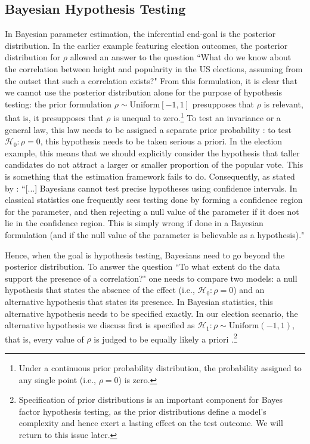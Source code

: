 \subsection{Bayesian Hypothesis Testing}
In Bayesian parameter estimation, the inferential end-goal is the posterior distribution. In the earlier example featuring election outcomes, the posterior distribution for $\rho$ allowed an answer to the question ``What do we know about the correlation between height and popularity in the US elections, assuming from the outset that such a correlation exists?" From this formulation, it is clear that we cannot use the posterior distribution alone for the purpose of hypothesis testing: the prior formulation $\rho \sim \text{Uniform}[-1,1]$ presupposes that $\rho$ is relevant, that is, it presupposes that $\rho$ is unequal to zero.\footnote{Under a continuous prior probability distribution, the probability assigned to any single point (i.e., $\rho = 0$) is zero.} To test an invariance or a general law, this law needs to be assigned a separate prior probability \cite{EtzWagenmakerssubm,Haldane1932,Jeffreys1961,Jeffreys1973,Jeffreys1980,LyEtAl2016,WrinchJeffreys1921,WrinchJeffreys1923}: to test $\mathcal{H}_0: \rho = 0$, this hypothesis needs to be taken serious a priori. In the election example, this means that we should explicitly consider the hypothesis that taller candidates do not attract a larger or smaller proportion of the popular vote. This is something that the estimation framework fails to do. Consequently, as stated by : ``[...] Bayesians cannot test precise hypotheses using confidence intervals. In classical statistics one frequently sees testing done by forming a confidence region for the parameter, and then rejecting a null value of the parameter if it does not lie in the confidence region. This is simply wrong if done in a Bayesian formulation (and if the null value of the parameter is believable as a hypothesis)."

Hence, when the goal is hypothesis testing, Bayesians need to go beyond the posterior distribution. To answer the question ``To what extent do the data support the presence of a correlation?" one needs to compare two models: a null hypothesis that states the absence of the effect (i.e., $\mathcal{H}_0: \rho = 0$) and an alternative hypothesis that states its presence. In Bayesian statistics, this alternative hypothesis needs to be specified exactly. In our election scenario, the alternative hypothesis we discuss first is specified as $\mathcal{H}_1: \rho \sim \text{Uniform}(-1,1)$, that is, every value of $\rho$ is judged to be equally likely a priori \cite{Jeffreys1961,LyEtAl2016}.\footnote{Specification of prior distributions is an important component for Bayes factor hypothesis testing, as the prior distributions define a model's complexity and hence exert a lasting effect on the test outcome. We will return to this issue later.}

